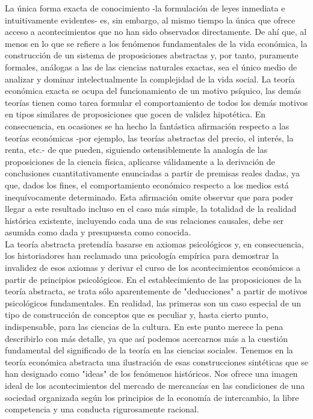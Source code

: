  La única forma exacta de conocimiento -la formulación de leyes inmediata e intuitivamente evidentes- es, sin embargo, al mismo tiempo la única que ofrece acceso a acontecimientos que no han sido observados directamente. De ahí que, al menos en lo que se refiere a los fenómenos fundamentales de la vida económica, la construcción de un sistema de proposiciones abstractas y, por tanto, puramente formales, análogas a las de las ciencias naturales exactas, sea el único medio de analizar y dominar intelectualmente la complejidad de la vida social. La teoría económica exacta se ocupa del funcionamiento de un motivo psíquico, las demás teorías tienen como tarea formular el comportamiento de todos los demás motivos en tipos similares de proposiciones que gocen de validez hipotética. En consecuencia, en ocasiones se ha hecho la fantástica afirmación respecto a las teorías económicas -por ejemplo, las teorías abstractas del precio, el interés, la renta, etc.- de que pueden, siguiendo ostensiblemente la analogía de las proposiciones de la ciencia física, aplicarse válidamente a la derivación de conclusiones cuantitativamente enunciadas a partir de premisas reales dadas, ya que, dados los fines, el comportamiento económico respecto a los medios está inequívocamente determinado. Esta afirmación omite observar que para poder llegar a este resultado incluso en el caso más simple, la totalidad de la realidad histórica existente, incluyendo cada una de sus relaciones causales, debe ser asumida como dada y presupuesta como conocida. \\

 La teoría abstracta pretendía basarse en axiomas psicológicos y, en consecuencia, los historiadores han reclamado una psicología empírica para demostrar la invalidez de esos axiomas y derivar el curso de los acontecimientos económicos a partir de principios psicológicos.  En el establecimiento de las proposiciones de la teoría abstracta, se trata sólo aparentemente de "deducciones" a partir de motivos psicológicos fundamentales. En realidad, las primeras son un caso especial de un tipo de construcción de conceptos que es peculiar y, hasta cierto punto, indispensable, para las ciencias de la cultura. En este punto merece la pena describirlo con más detalle, ya que así podemos acercarnos más a la cuestión fundamental del significado de la teoría en las ciencias sociales. Tenemos en la teoría económica abstracta una ilustración de esas construcciones sintéticas que se han designado como "ideas" de los fenómenos históricos. Nos ofrece una imagen ideal de los acontecimientos del mercado de mercancías en las condiciones de una sociedad organizada según los principios de la economía de intercambio, la libre competencia y una conducta rigurosamente racional. 



